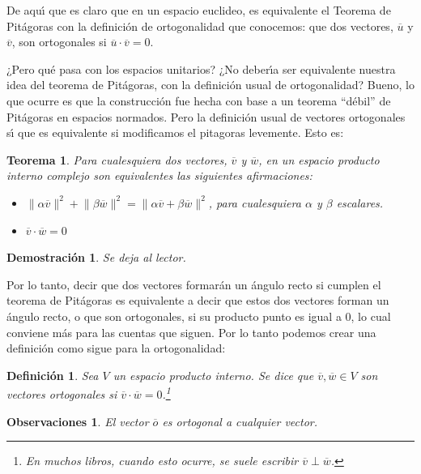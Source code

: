 \documentclass[a4paper,11pt]{article}
\theoremstyle{teoremas}
\newtheorem{teorema}{Teorema}[section]
\theoremstyle{ejemplos}
\theoremstyle{definiciones}
\theoremstyle{lemas}
\newtheorem*{definicion}{Definici\'on}
\newtheorem*{demostracion}{Demostraci\'on}
\newtheorem*{observaciones}{Observaciones}
\begin{document}
De aqu\'{\i} que es claro que en un espacio euclideo, es equivalente el Teorema de Pit\'agoras con la definici\'on de ortogonalidad que conocemos: que dos vectores, $\overline{u}$ y $\overline{v}$, son ortogonales si $\overline{u}\cdot \overline{v} = 0$.
\par 
¿Pero qu\'e pasa con los espacios unitarios? ¿No deber\'{\i}a ser equivalente nuestra idea del teorema de Pit\'agoras, con la definici\'on usual de ortogonalidad? Bueno, lo que ocurre es que la construcci\'on fue hecha con base a un teorema ``d\'ebil'' de Pit\'agoras en espacios normados. Pero la definici\'on usual de vectores ortogonales s\'{\i} que es equivalente si modificamos el pitagoras levemente. Esto es:
\begin{teorema}
 Para cualesquiera dos vectores, $\overline{v}$ y $\overline{w}$, en un espacio producto interno complejo son equivalentes las siguientes afirmaciones:
 \begin{itemize}
  \item $\lVert \alpha \overline{v} \rVert^2 + \lVert \beta \overline{w} \rVert^2 = \lVert \alpha \overline{v} + \beta\overline{w} \rVert^2$, para cualesquiera $\alpha$ y $\beta$ escalares.
  \item $\overline{v} \cdot \overline{w} = 0$
 \end{itemize}
\end{teorema}

\begin{demostracion}
 Se deja al lector.
\end{demostracion}

Por lo tanto, decir que dos vectores formar\'an un \'angulo recto si cumplen el teorema de Pit\'agoras es equivalente a decir que estos dos vectores forman un \'angulo recto, o que son ortogonales, si su producto punto es igual a 0, lo cual conviene m\'as para las cuentas que siguen. Por lo tanto podemos crear una definici\'on como sigue para la ortogonalidad:

\begin{definicion}
 Sea $V$ un espacio producto interno. Se dice que $\overline{v},\overline{w}\in V$ son \textit{vectores ortogonales} si $\overline{v}\cdot\overline{w}=0$.\footnote{En muchos libros, cuando esto ocurre, se suele escribir $\overline{v}\perp\overline{w}$.}
\end{definicion}

\begin{observaciones}
 El vector $\overline{o}$ es ortogonal a cualquier vector.
\end{observaciones}
\end{document}
